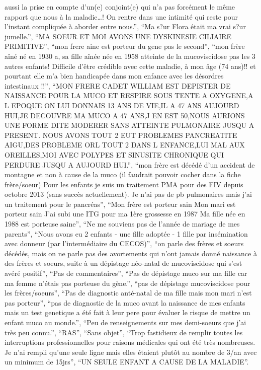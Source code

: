 \documentclass[
  letterpaper,
  DIV=11,
  numbers=noendperiod]{scrartcl}
\begin{document}
\begin{itemize}
  aussi la prise en compte d'un(e) conjoint(e) qui n'a pas forcément le
  même rapport que nous à la maladie\ldots! On rentre dans une intimité
  qui reste pour l'instant compliquée à aborder entre nous.'', ``Ma s?ur
  Flora était ma vrai s?ur jumelle.'', ``MA SOEUR ET MOI AVONS UNE
  DYSKINESIE CILIAIRE PRIMITIVE'', ``mon frere aine est porteur du gene
  pas le second'', ``mon frère aîné né en 1930 a, sa fille aînée née en
  1958 atteinte de la mucoviscidose pas les 3 autres enfants! Difficile
  d'être crédible avec cette maladie, à mon âge (74 ans)!! et pourtant
  elle m'a bien handicapée dans mon enfance avec les désordres
  intestinaux !!'', ``MON FRERE CADET WILLIAM EST DEPISTER DE NAISSANCE
  POUR LA MUCO ET RESPIRE SOUS TENTE A OXYGENE,A L EPOQUE ON LUI DONNAIS
  13 ANS DE VIE,IL A 47 ANS AUJOURD HUI,JE DECOUVRE MA MUCO A 47 ANS,J
  EN EST 50,NOUS AURIONS UNE FORME DITE MODERER SANS ATTEINTE PULMONAIRE
  JUSQU A PRESENT. NOUS AVONS TOUT 2 EUT PROBLEMES PANCREATITE AIGU,DES
  PROBLEME ORL TOUT 2 DANS L ENFANCE,LUI MAL AUX OREILLES,MOI AVEC
  POLYPES ET SINUSITE CHRONIQUE QUI PERDURE JUSQU A AUJOURD HUI.'',
  ``mon frère est décédé d'un accident de montagne et non à cause de la
  muco (il faudrait pouvoir cocher dans la fiche frère/soeur) Pour les
  enfants je suis un traitement PMA pour des FIV depuis octobre 2013
  (sans succès actuellement). Je n'ai pas de pb pulmonaires mais j'ai un
  traitement pour le pancréas'', ``Mon frère est porteur sain Mon mari
  est porteur sain J'ai subi une ITG pour ma 1ère grossesse en 1987 Ma
  fille née en 1988 est porteuse saine'', ``Ne me souviens pas de
  l'année de mariage de mes parents'', ``Nous avons eu 2 enfants - une
  fille adoptée - 1 fille par insémination avec donneur (par
  l'intermédiaire du CECOS)'', ``on parle des frères et soeurs décédés,
  mais on ne parle pas des avortements qui n'ont jamais donné naissance
  à des frères et soeurs, suite à un dépistage néo-natal de
  mucoviscidose qui s'est avéré positif'', ``Pas de commentaires'',
  ``Pas de dépistage muco sur ma fille car ma femme n'étais pas porteuse
  du gène.'', ``pas de dépistage mucoviscidose pour les frères/soeurs'',
  ``Pas de diagnostic anté-natal de ma fille mais mon mari n'est pas
  porteur'', ``pas de diagnostic de la muco avant la naissance de mes
  enfants mais un test genetique a été fait à leur pere pour évaluer le
  risque de mettre un enfant muco au monde.'', ``Peu de renseignements
  sur mes demi-soeurs que j'ai très peu connu.'', ``RAS'', ``Sans
  objet'', ``Trop fastidieux de remplir toutes les interruptions
  professionnelles pour raisons médicales qui ont été très nombreuses.
  Je n'ai rempli qu'une seule ligne mais elles étaient plutôt au nombre
  de 3/an avec un minimum de 15jrs'', ``UN SEULE ENFANT A CAUSE DE LA
  MALADIE''.
\end{itemize}
\end{document}
